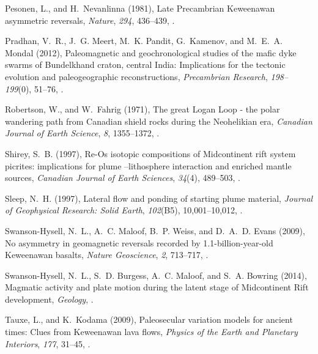 \documentclass[draft,gc]{AGUTeX}
\begin{document}
\begin{article}
\begin{thebibliography}{24}
Pesonen, L., and H.~Nevanlinna (1981), Late {P}recambrian {K}eweenawan
  asymmetric reversals, \textit{Nature}, \textit{294}, 436--439,
  .

Pradhan, V.~R., J.~G. Meert, M.~K. Pandit, G.~Kamenov, and M.~E.~A. Mondal
  (2012), Paleomagnetic and geochronological studies of the mafic dyke swarms
  of {Bundelkhand craton, central India}: Implications for the tectonic
  evolution and paleogeographic reconstructions, \textit{Precambrian Research},
  \textit{198--199}(0), 51--76, .
  
Robertson, W., and W.~Fahrig (1971), The great {L}ogan {L}oop - the polar
  wandering path from {C}anadian shield rocks during the {N}eohelikian era,
  \textit{Canadian Journal of Earth Science}, \textit{8}, 1355--1372, .

Shirey, S.~B. (1997), {Re-Os isotopic compositions of Midcontinent rift system
  picrites: implications for plume --lithosphere interaction and enriched
  mantle sources}, \textit{Canadian Journal of Earth Sciences}, \textit{34}(4),
  489--503, .
  
Sleep, N.~H. (1997), Lateral flow and ponding of starting plume material,
  \textit{Journal of Geophysical Research: Solid Earth}, \textit{102}(B5),
  10,001--10,012, .

Swanson-Hysell, N.~L., A.~C. Maloof, B.~P. Weiss, and D.~A.~D. Evans (2009), No
  asymmetry in geomagnetic reversals recorded by 1.1-billion-year-old
  {K}eweenawan basalts, \textit{Nature Geoscience}, \textit{2}, 713--717,
  .
  
Swanson-Hysell, N.~L., S.~D. Burgess, A.~C. Maloof, and S.~A. Bowring (2014),
  Magmatic activity and plate motion during the latent stage of
  {M}idcontinent {R}ift development, \textit{Geology}, .
  
Tauxe, L., and K.~Kodama (2009), Paleosecular variation models for ancient
  times: Clues from {K}eweenawan lava flows, \textit{Physics of the Earth and
  Planetary Interiors}, \textit{177}, 31--45, .


\end{thebibliography}
\end{article}
\end{document}
